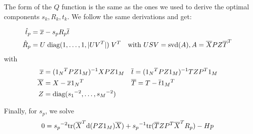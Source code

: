 The form of the $Q$ function is the same as the ones we used to derive the optimal components $s_k, R_k, t_k$. We follow the same derivations and get: 

\begin{align*}
\hat t_p &= \overline{x} - s_pR_p\overline{t}\\
\hat R_p &= U\;\text{diag}(1, \ldots, 1, |UV^T|)\;V^T & \text{with } USV = \text{svd}(A), A = \overline{X} P Z {\overline{T}}^T \\
\end{align*}
with 
\begin{align*}
\overline{x} &= ({1_N}^TPZ1_M)^{-1} XPZ1_M & & \overline{t} = ({1_N}^TPZ1_M)^{-1}TZP^T1_M\\
\overline{X} &= X - \overline{x}{1_N}^T & &\overline{T} = T - \overline{t} {1_M}^T\\
Z &= \text{diag}({s_1}^{-2}, \ldots, {s_M}^{-2})\\
\end{align*}

Finally, for $s_p$, we solve
\[
0 = {s_p}^{-2}\text{tr}(\overline{X}^T\text{d}(PZ1_M)\overline{X}) + {s_p}^{-1} \text{tr}(\overline{T}ZP^T\overline{X}^TR_p) - H p
\]

